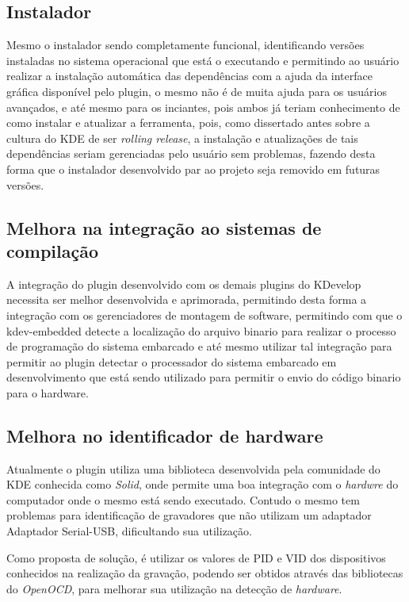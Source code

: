 \subsection{Instalador}
Mesmo o instalador sendo completamente funcional, identificando versões instaladas no sistema operacional que está o executando e
permitindo ao usuário realizar a instalação automática das dependências com a ajuda da interface gráfica disponível pelo plugin, o mesmo não é de muita ajuda para os usuários avançados, e até mesmo para os inciantes, pois ambos já teriam conhecimento de como instalar e atualizar a ferramenta, pois, como dissertado antes sobre a cultura do KDE de ser \textit{rolling release}, a instalação e atualizações de tais dependências seriam gerenciadas pelo usuário sem problemas, fazendo desta forma que o instalador desenvolvido par ao projeto seja removido em futuras versões.

\subsection{Melhora na integração ao sistemas de compilação}
A integração do plugin desenvolvido com os demais plugins do KDevelop necessita ser melhor desenvolvida e aprimorada, permitindo desta
forma a integração com os gerenciadores de montagem de software, permitindo com que o kdev-embedded detecte a localização do arquivo
binario para realizar o processo de programação do sistema embarcado e até mesmo utilizar tal integração para permitir ao plugin
detectar o processador do sistema embarcado em desenvolvimento que está sendo utilizado para permitir o envio do código binario para
o hardware.

\subsection{Melhora no identificador de hardware}
Atualmente o plugin utiliza uma biblioteca desenvolvida pela comunidade do KDE conhecida como \textit{Solid}, onde permite uma boa integração com o \textit{hardwre} do computador onde o mesmo está sendo executado. Contudo o mesmo tem problemas para identificação de gravadores que não utilizam um adaptador Adaptador Serial-USB, dificultando sua utilização. 

Como proposta de solução, é utilizar os valores de PID e VID dos dispositivos conhecidos na realização da gravação, podendo ser obtidos através das bibliotecas do \textit{OpenOCD}, para melhorar sua utilização na detecção de \textit{hardware}.

